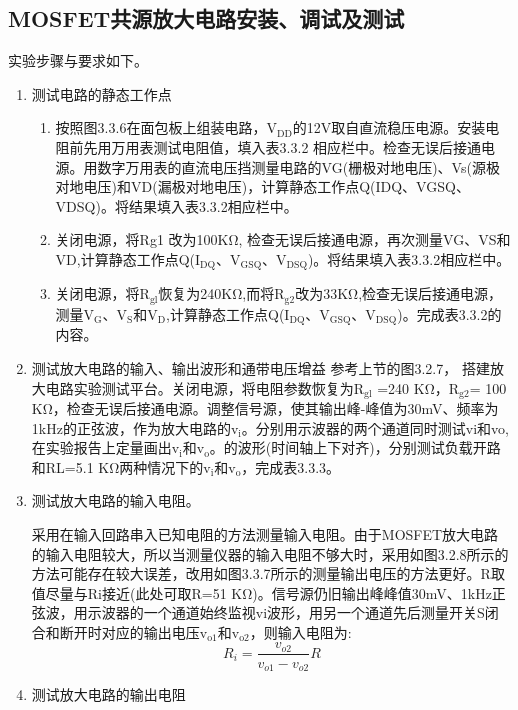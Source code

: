 \documentclass[a4paper]{article}
\theoremstyle{definition}
\theoremstyle{plain}
\theoremstyle{remark}
\begin{document}
\subsection{MOSFET共源放大电路安装、调试及测试}
实验步骤与要求如下。
\begin{enumerate}
	\item 测试电路的静态工作点
	      \begin{enumerate}[label=(\arabic*)]
		      \item 按照图3.3.6在面包板上组装电路，$\mathrm{V_{DD}}$的12V取自直流稳压电源。安装电阻前先用万用表测试电阻值，填入表3.3.2 相应栏中。检查无误后接通电源。用数字万用表的直流电压挡测量电路的VG(栅极对地电压)、Vs(源极对地电压)和VD(漏极对地电压)，计算静态工作点Q(IDQ、VGSQ、VDSQ)。将结果填入表3.3.2相应栏中。
		      \item 关闭电源，将Rg1 改为100KΩ, 检查无误后接通电源，再次测量VG、VS和VD,计算静态工作点Q($\mathrm{I_{DQ}}$、$\mathrm{V_{GSQ}}$、$\mathrm{V_{DSQ}}$)。将结果填入表3.3.2相应栏中。
		      \item 关闭电源，将$\mathrm{R_{gl}}$恢复为240KΩ,而将$\mathrm{R_{g2}}$改为33KΩ,检查无误后接通电源，测量$\mathrm{V_G}$、$\mathrm{V_S}$和$\mathrm{V_D}$,计算静态工作点Q($\mathrm{I_{DQ}}$、$\mathrm{V_{GSQ}}$、$\mathrm{V_{DSQ}}$)。完成表3.3.2的内容。
	      \end{enumerate}

	\item 测试放大电路的输入、输出波形和通带电压增益
	      参考上节的图3.2.7， 搭建放大电路实验测试平台。关闭电源，将电阻参数恢复为$\mathrm{R_{gl}}$ =240 KΩ，$\mathrm{R_{g2}}$= 100 KΩ，检查无误后接通电源。调整信号源，使其输出峰-峰值为30mV、频率为1kHz的正弦波，作为放大电路的$\mathrm{v_i}$。分别用示波器的两个通道同时测试vi和vo,在实验报告上定量画出$\mathrm{v_i}$和$\mathrm{v_o}$。的波形(时间轴上下对齐)，分别测试负载开路和RL=5.1 KΩ两种情况下的$\mathrm{v_i}$和$\mathrm{v_o}$，完成表3.3.3。

	\item 测试放大电路的输入电阻。

	      采用在输入回路串入已知电阻的方法测量输入电阻。由于MOSFET放大电路的输入电阻较大，所以当测量仪器的输入电阻不够大时，采用如图3.2.8所示的方法可能存在较大误差，改用如图3.3.7所示的测量输出电压的方法更好。R取值尽量与Ri接近(此处可取R=51 KΩ)。信号源仍旧输出峰峰值30mV、1kHz正弦波，用示波器的一个通道始终监视vi波形，用另一个通道先后测量开关S闭合和断开时对应的输出电压$\mathrm{v_{o1}}$和$\mathrm{v_{o2}}$，则输入电阻为:
	      \begin{equation}
		      R_i=\frac{v_{o2}}{v_{o1}-v_{o2}}R
	      \end{equation}
	\item 测试放大电路的输出电阻


\end{enumerate}
\end{document}
